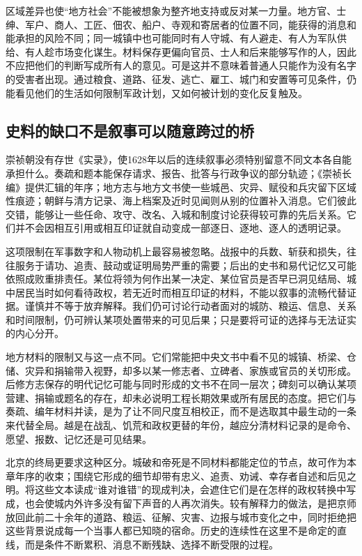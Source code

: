 区域差异也使“地方社会”不能被想象为整齐地支持或反对某一力量。地方官、士绅、军户、商人、工匠、佃农、船户、寺观和寄居者的位置不同，能获得的消息和能承担的风险不同；同一城镇中也可能同时有人守城、有人避走、有人为军队供给、有人趁市场变化谋生。材料保存更偏向官员、士人和后来能够写作的人，因此不应把他们的判断写成所有人的意见。可是这并不意味着普通人只能作为没有名字的受害者出现。通过粮食、道路、征发、逃亡、雇工、城门和安置等可见条件，仍能看见他们的生活如何限制军政计划，又如何被计划的变化反复触及。

\subsection{史料的缺口不是叙事可以随意跨过的桥}

崇祯朝没有存世《实录》，使1628年以后的连续叙事必须特别留意不同文本各自能承担什么。奏疏和题本能保存请求、报告、批答与行政争议的部分轨迹；《崇祯长编》提供汇辑的年序；地方志与地方文书使一些城邑、灾异、赋役和兵灾留下区域性痕迹；朝鲜与清方记录、海上档案及近时见闻则从别的位置补入消息。它们彼此交错，能够让一些任命、攻守、改名、入城和制度讨论获得较可靠的先后关系。它们并不会因相互引用或相互印证就自动变成一部逐日、逐地、逐人的透明记录。

这项限制在军事数字和人物动机上最容易被忽略。战报中的兵数、斩获和损失，往往服务于请功、追责、鼓动或证明局势严重的需要；后出的史书和易代记忆又可能依照成败重排责任。某位将领为何作出某一决定、某位官员是否早已洞见结局、城中居民当时如何看待政权，若无近时而相互印证的材料，不能以叙事的流畅代替证据。谨慎并不等于放弃解释。我们仍可讨论行动者面对的城防、粮运、信息、关系和时间限制，仍可辨认某项处置带来的可见后果；只是要将可证的选择与无法证实的内心分开。

地方材料的限制又与这一点不同。它们常能把中央文书中看不见的城镇、桥梁、仓储、灾异和捐输带入视野，却多以某一修志者、立碑者、家族或官员的关切形成。后修方志保存的明代记忆可能与同时形成的文书不在同一层次；碑刻可以确认某项营建、捐输或题名的存在，却未必说明工程长期效果或所有居民的态度。把它们与奏疏、编年材料并读，是为了让不同尺度互相校正，而不是选取其中最生动的一条来代替全局。越是在战乱、饥荒和政权更替的年份，越应分清材料记录的是命令、愿望、报数、记忆还是可见结果。

北京的终局更要求这种区分。城破和帝死是不同材料都能定位的节点，故可作为本章年序的收束；围绕它形成的细节却带有忠义、追责、劝诫、幸存者自述和后见之明。将这些文本读成“谁对谁错”的现成判决，会遮住它们是在怎样的政权转换中写成，也会使城内外许多没有留下声音的人再次消失。较有解释力的做法，是把京师放回此前二十余年的道路、粮运、征解、灾害、边报与城市变化之中，同时拒绝把这些背景说成每一个当事人都已知晓的宿命。历史的连续性在这里不是命定的直线，而是条件不断累积、消息不断残缺、选择不断受限的过程。

